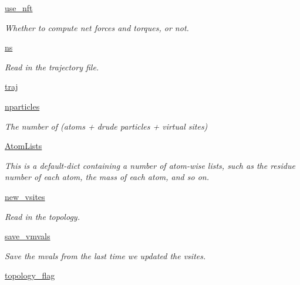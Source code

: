 \begin{DoxyCompactItemize}
\item 
\hyperlink{classforcebalance_1_1abinitio_1_1AbInitio_afd8d179560a295ffa6c6309843c59279}{use\-\_\-nft}
\begin{DoxyCompactList}\small\item\em Whether to compute net forces and torques, or not. \end{DoxyCompactList}\item 
\hyperlink{classforcebalance_1_1abinitio_1_1AbInitio_a1e8248e2efe952362b1b21462a70b540}{ns}
\begin{DoxyCompactList}\small\item\em Read in the trajectory file. \end{DoxyCompactList}\item 
\hyperlink{classforcebalance_1_1abinitio_1_1AbInitio_a7b52d5101bfa4fde7129c84c0558ad14}{traj}
\item 
\hyperlink{classforcebalance_1_1abinitio_1_1AbInitio_aef3798e4666b91ecc4c526b679eb4908}{nparticles}
\begin{DoxyCompactList}\small\item\em The number of (atoms + drude particles + virtual sites) \end{DoxyCompactList}\item 
\hyperlink{classforcebalance_1_1abinitio_1_1AbInitio_a7e62a74e820ac0c5dd67f49155b95c41}{Atom\-Lists}
\begin{DoxyCompactList}\small\item\em This is a default-\/dict containing a number of atom-\/wise lists, such as the residue number of each atom, the mass of each atom, and so on. \end{DoxyCompactList}\item 
\hyperlink{classforcebalance_1_1abinitio_1_1AbInitio_a64f1aeadac4d7b09424c20b83e5ad5af}{new\-\_\-vsites}
\begin{DoxyCompactList}\small\item\em Read in the topology. \end{DoxyCompactList}\item 
\hyperlink{classforcebalance_1_1abinitio_1_1AbInitio_a22037bf43728fa45f387390005e0b131}{save\-\_\-vmvals}
\begin{DoxyCompactList}\small\item\em Save the mvals from the last time we updated the vsites. \end{DoxyCompactList}\item 
\hyperlink{classforcebalance_1_1abinitio_1_1AbInitio_a09689e626b75720b097c36f922507950}{topology\-\_\-flag}

\end{DoxyCompactItemize}
